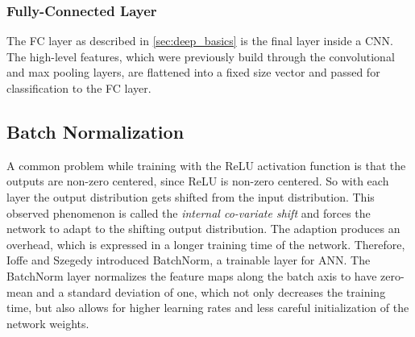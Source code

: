 \subsubsection{Fully-Connected Layer}

The \ac{FC} layer as described in \ref{sec:deep_basics} is the final layer inside a \ac{CNN}.
The high-level features, which were previously build through the convolutional and max pooling layers, are flattened into a fixed size vector and passed for classification to the \ac{FC} layer.

\subsection{Batch Normalization}

A common problem while training with the \ac{ReLU} activation function is that the outputs are non-zero centered, since \ac{ReLU} is non-zero centered.
So with each layer the output distribution gets shifted from the input distribution.
This observed phenomenon is called the \textit{internal co-variate shift} and forces the network to adapt to the shifting output distribution.
The adaption produces an overhead, which is expressed in a longer training time of the network.
Therefore, Ioffe and Szegedy \cite{batchnorm} introduced \ac{BatchNorm}, a trainable layer for \ac{ANN}.
The \ac{BatchNorm} layer normalizes the feature maps along the batch axis to have zero-mean and a standard deviation of one, which not only decreases the training time, but also allows for higher learning rates and less careful initialization of the network weights.
